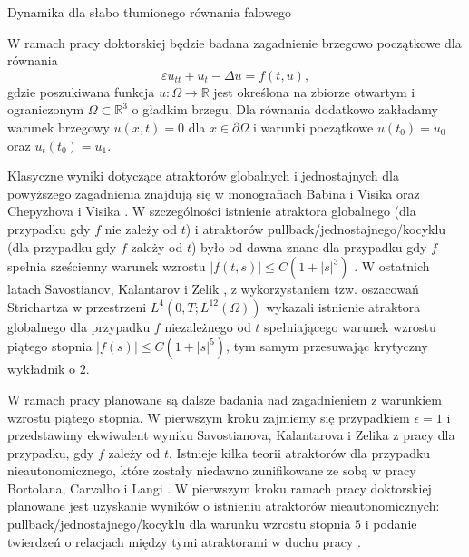 \documentclass{amsproc}
\theoremstyle{definition}
\numberwithin{equation}{section}
\begin{document}
\begin{center}
\begin{large}
	Dynamika dla słabo tłumionego równania falowego
	\end{large}
\end{center}

\medskip
\medskip

W ramach pracy doktorskiej będzie badana zagadnienie brzegowo początkowe dla równania
$$
\varepsilon u_{tt} + u_t - \Delta u = f(t,u),
$$
gdzie poszukiwana funkcja $u:\Omega \to \mathbb{R}$ jest określona na zbiorze otwartym i ograniczonym $\Omega\subset \mathbb{R}^3$ o gładkim brzegu.
Dla równania dodatkowo zakładamy warunek brzegowy $u(x,t) = 0$ dla $x\in \partial \Omega$ i warunki początkowe $u(t_0)=u_0$ oraz $u_t(t_0) = u_1$.  

Klasyczne wyniki dotyczące atraktorów globalnych i jednostajnych dla powyższego zagadnienia znajdują się w monografiach Babina i Visika \cite{Babin-Vishik-1992} oraz Chepyzhova i Visika \cite{Chepyzhov-Vishik-2002}. W szczególności istnienie atraktora globalnego (dla przypadku gdy $f$ nie zależy od $t$) i atraktorów pullback/jednostajnego/kocyklu (dla przypadku gdy $f$ zależy od $t$) było od dawna znane dla przypadku gdy $f$ spełnia sześcienny warunek wzrostu $|f(t,s)|\leq C(1+|s|^3)$ \cite{Arrieta-Carvalho-Hale-1992}. W ostatnich latach Savostianov, Kalantarov i Zelik \cite{Savostianov}, z wykorzystaniem tzw. oszacowań Strichartza w przestrzeni $L^4(0,T;L^{12}(\Omega))$ wykazali istnienie atraktora globalnego dla przypadku $f$ niezależnego od $t$ spełniającego warunek wzrostu piątego stopnia $|f(s)|\leq C(1+|s|^5)$, tym samym przesuwając krytyczny wykładnik o $2$. 

W ramach pracy planowane są dalsze badania nad zagadnieniem z warunkiem wzrostu piątego stopnia. W pierwszym kroku zajmiemy się przypadkiem $\epsilon=1$ i przedstawimy ekwiwalent wyniku Savostianova, Kalantarova i Zelika z pracy \cite{Savostianov} dla przypadku, gdy $f$ zależy od $t$. Istnieje kilka teorii atraktorów dla przypadku nieautonomicznego, które zostały niedawno zunifikowane ze sobą w pracy Bortolana, Carvalho i Langi \cite{Bortolan-Carvalho-Langa-2014}. W pierwszym kroku ramach pracy doktorskiej planowane jest uzyskanie wyników o istnieniu atraktorów nieautonomicznych: pullback/jednostajnego/kocyklu dla warunku wzrostu stopnia $5$ i podanie twierdzeń o relacjach między tymi atraktorami w duchu pracy \cite{Bortolan-Carvalho-Langa-2014}. 
\end{document}
